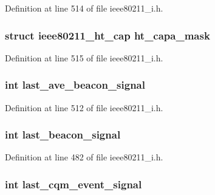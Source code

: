 Definition at line 514 of file ieee80211\-\_\-i.\-h.

\hypertarget{structieee80211__if__managed_a33ba3774e4e37a83cef9b63d23b4dc29}{
\subsubsection[{ht\-\_\-capa\-\_\-mask}]{\setlength{\rightskip}{0pt plus 5cm}struct ieee80211\-\_\-ht\-\_\-cap ht\-\_\-capa\-\_\-mask}}\label{structieee80211__if__managed_a33ba3774e4e37a83cef9b63d23b4dc29}


Definition at line 515 of file ieee80211\-\_\-i.\-h.

\hypertarget{structieee80211__if__managed_a74da56491351b6b4b406a63bfcb3d154}{
\subsubsection[{last\-\_\-ave\-\_\-beacon\-\_\-signal}]{\setlength{\rightskip}{0pt plus 5cm}int last\-\_\-ave\-\_\-beacon\-\_\-signal}}\label{structieee80211__if__managed_a74da56491351b6b4b406a63bfcb3d154}


Definition at line 512 of file ieee80211\-\_\-i.\-h.

\hypertarget{structieee80211__if__managed_a2cb78bcdf63c4c28095302c2570c89c1}{
\subsubsection[{last\-\_\-beacon\-\_\-signal}]{\setlength{\rightskip}{0pt plus 5cm}int last\-\_\-beacon\-\_\-signal}}\label{structieee80211__if__managed_a2cb78bcdf63c4c28095302c2570c89c1}


Definition at line 482 of file ieee80211\-\_\-i.\-h.

\hypertarget{structieee80211__if__managed_ad0b63098dcdc5575332f354e99fec846}{
\subsubsection[{last\-\_\-cqm\-\_\-event\-\_\-signal}]{\setlength{\rightskip}{0pt plus 5cm}int last\-\_\-cqm\-\_\-event\-\_\-signal}}\label{structieee80211__if__managed_ad0b63098dcdc5575332f354e99fec846}



